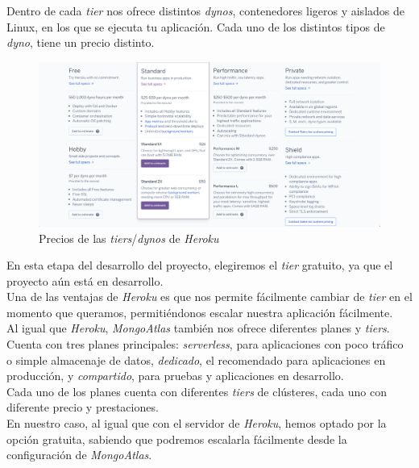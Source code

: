 Dentro de cada \textit{tier} nos ofrece distintos \textit{dynos}, contenedores ligeros y aislados de Linux, en los que
se ejecuta tu aplicación. Cada uno de los distintos tipos de \textit{dyno}, tiene un precio distinto.\\

\begin{figure}[H]
    \centering	
        \includegraphics[scale=0.25]{img/heroku-tiers.png}
    \caption{ Precios de las \textit{tiers}/\textit{dynos} de \textit{Heroku} }\label{fig:heroku-tiers}
\end{figure}

En esta etapa del desarrollo del proyecto, elegiremos el \textit{tier} gratuito, ya que el proyecto aún está en
desarrollo.\\

Una de las ventajas de \textit{Heroku} es que nos permite fácilmente cambiar de \textit{tier} en el momento que
queramos, permitiéndonos escalar nuestra aplicación fácilmente.\\

Al igual que \textit{Heroku}, \textit{MongoAtlas} también nos ofrece diferentes planes y \textit{tiers}.\\

Cuenta con tres planes principales: \textit{serverless}, para aplicaciones con poco tráfico o simple almacenaje de
datos, \textit{dedicado}, el recomendado para aplicaciones en producción, y \textit{compartido}, para pruebas y 
aplicaciones en desarrollo.\\

Cada uno de los planes cuenta con diferentes \textit{tiers} de clústeres, cada uno con diferente precio y
prestaciones.\\

En nuestro caso, al igual que con el servidor de \textit{Heroku}, hemos optado por la opción gratuita, sabiendo que
podremos escalarla fácilmente desde la configuración de \textit{MongoAtlas}.\\


